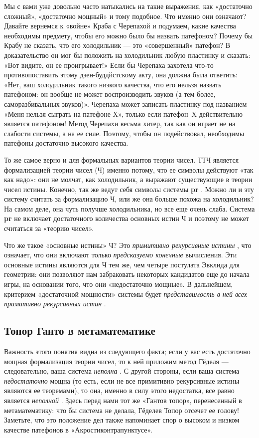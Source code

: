 \documentclass[../main.tex]{subfiles}
\begin{document}
Мы с вами уже довольно часто натыкались на такие выражения, как «достаточно сложный», «достаточно мощный» и тому подобное. Что именно они означают? Давайте вернемся к «войне» Краба с Черепахой и подумаем, какие качества необходимы предмету, чтобы его можно было бы назвать патефоном? Почему бы Крабу не сказать, что его холодильник --- это «совершенный» патефон? В доказательство он мог бы положить на холодильник любую пластинку и сказать: «Вот видите, он ее проигрывает!» Если бы Черепаха захотела что-то противопоставить этому дзен-буддйстскому акту, она должна была ответить: «Нет, ваш холодильник такого низкого качества, что его нельзя назвать патефоном: он вообще не может воспроизводить звуков (а тем более, саморазбивальных звуков)». Черепаха может записать пластинку под названием «Меня нельзя сыграть на патефоне X», только если патефон~X действительно является патефоном! Метод Черепахи весьма хитер, так как он играет не на слабости системы, а на ее силе. Поэтому, чтобы он подействовал, необходимы патефоны достаточно высокого качества.

То же самое верно и для формальных вариантов теории чисел. ТТЧ является формализацией теории чисел (Ч) именно потому, что ее символы действуют «так как надо»: они не молчат, как холодильник, а выражают существующие в теории чисел истины. Конечно, так же ведут себя символы системы \textbf{pr} . Можно ли и эту систему считать за формализацию Ч, или же она больше похожа на холодильник? На самом деле, она чуть получше холодильника, но все еще очень слаба. Система \textbf{pr} не включает достаточного количества основных истин Ч и поэтому не может считаться за «теорию чисел».

Что же такое «основные истины» Ч? Это \emph{примитивно рекурсивные истины} , что означает, что они включают только \emph{предсказуемо конечные} вычисления. Эти основные истины являются для Ч тем же, чем четыре постулата Эвклида для геометрии: они позволяют нам забраковать некоторых кандидатов еще до начала игры, на основании того, что они «недостаточно мощные». В дальнейшем, критерием «достаточной мощности» системы будет \emph{представимость в ней всех примитивно рекурсивных истин} .


\subsection{Топор Ганто в метаматематике}

Важность этого понятия видна из следующего факта; если у вас есть достаточно мощная формализация теории чисел, то к ней приложим метод Гёделя --- следовательно, ваша система \emph{неполна} . С другой стороны, если ваша система \emph{недостаточно} мощна (то есть, если не все примитивно рекурсивные истины являются ее теоремами), то она, именно в силу этого недостатка, все равно является \emph{неполной} . Здесь перед нами тот же «Гантов топор», перенесенный в метаматематику: что бы система не делала, Гёделев Топор отсечет ее голову! Заметьте, что это положение дел также напоминает спор о высоком и низком качестве патефонов в «Акростиконтрапунктусе».
\end{document}
